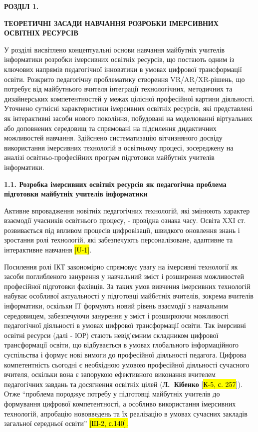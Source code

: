 \textbf{РОЗДІЛ 1.}

\textbf{ТЕОРЕТИЧНІ ЗАСАДИ НАВЧАННЯ РОЗРОБКИ ІМЕРСИВНИХ ОСВІТНІХ РЕСУРСІВ}

У розділі висвітлено концептуальні основи навчання майбутніх учителів інформатики розробки імерсивних освітніх ресурсів, що постають одним із ключових напрямів педагогічної інноватики в умовах цифрової трансформації освіти. Розкрито педагогічну проблематику створення VR/AR/XR-рішень, що потребує від майбутнього вчителя інтеграції технологічних, методичних та дизайнерських компетентностей у межах цілісної професійної картини діяльності. Уточнено сутнісні характеристики імерсивних освітніх ресурсів, які представлені як інтерактивні засоби нового покоління, побудовані на моделюванні віртуальних або доповнених середовищ та спрямовані на підсилення дидактичних можливостей навчання. Здійснено систематизацію вітчизняного досвіду використання імерсивних технологій в освітньому процесі, зосереджену на аналізі освітньо-професійних програм підготовки майбутніх учителів інформатики.

\textbf{1.1. Розробка імерсивних освітніх ресурсів як педагогічна проблема підготовки майбутніх учителів інформатики}

Активне впровадження новітніх педагогічних технологій, які змінюють характер взаємодії учасників освітнього процесу, - провідна ознака часу. Освіта XXI ст. розвивається під впливом процесів цифровізації, швидкого оновлення знань і зростання ролі технологій, які забезпечують персоналізоване, адаптивне та інтерактивне навчання \hl{{[}U-1{]}}.

Посилення ролі ІКТ закономірно спрямовує увагу на імерсивні технології як засоби поглибленого занурення у навчальний зміст і розширення можливостей професійної підготовки фахівців. За таких умов вивчення імерсивних технологій набуває особливої актуальності у підготовці майбeтніх вчителів, зокрема вчителів інформатики, оскільки ІТ формують новий рівень взаємодії з навчальним середовищем, забезпечуючи занурення у зміст і розширюючи можливості педагогічної діяльності в умовах цифрової трансформації освіти. Так імерсивні освітні ресурси (далі - ІОР) стають невід'ємним складником цифрової трансформації освіти, що відбувається в умовах глобального інформаційного суспільства і формує нові вимоги до професійної діяльності педагога. Цифрова компетентність сьогодні є необхідною умовою професійної діяльності сучасного вчителя, оскільки вона є запорукою ефективного виконання вчителем педагогічних завдань та досягнення освітніх цілей (\textbf{Л.~Кібенко} {[}\hl{К-5, с. 257}{]}). Отже ``проблема породжує потребу у підготовці майбутніх учителів до формування цифрової компетентності, а особливо використання імерсивних технологій, апробацію нововведень та їх реалізацію в умовах сучасних закладів загальної середньої освіти'' \hl{{[}Ш-2, с.140{]}.}

